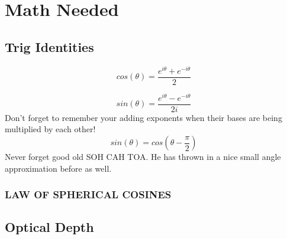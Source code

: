 \documentclass{article}
\begin{document}














\section{Math Needed}
\subsection{Trig Identities}
\begin{equation}
    cos(\theta)= \frac{e^{i \theta}+e^{-i \theta}}{2}
\end{equation}

\begin{equation}
    sin(\theta)= \frac{e^{i \theta}-e^{-i \theta}}{2i}
\end{equation}
Don't forget to remember your adding exponents when their bases are being multiplied by each other!
\begin{equation}
    sin(\theta)= cos(\theta - \frac{\pi}{2}) 
\end{equation}
Never forget good old SOH CAH TOA. 
He has thrown in a nice small angle approximation before as well. 

\subsubsection{LAW OF SPHERICAL COSINES}


\subsection{Optical Depth}
\end{document}
